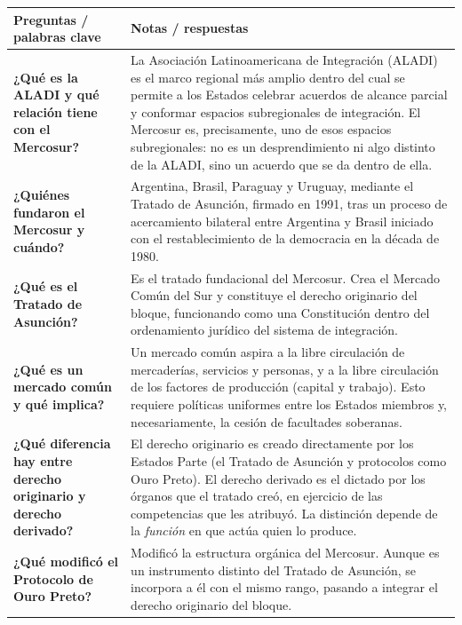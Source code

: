 \documentclass[12pt,oneside]{book}
\begin{document}
\begin{table}[H]
\centering
\begin{tabularx}{\textwidth}{
    >{\raggedright\arraybackslash}p{}
    >{\raggedright\arraybackslash}X
}
\toprule
\textbf{\large Preguntas / palabras clave} &
\textbf{\large Notas / respuestas} \\
\midrule

\textbf{¿Qué es la ALADI y qué relación tiene con el Mercosur?} &
La Asociación Latinoamericana de Integración (ALADI) es el marco regional más amplio dentro del cual se permite a los Estados celebrar acuerdos de alcance parcial y conformar espacios subregionales de integración. El Mercosur es, precisamente, uno de esos espacios subregionales: no es un desprendimiento ni algo distinto de la ALADI, sino un acuerdo que se da dentro de ella. \\

\textbf{¿Quiénes fundaron el Mercosur y cuándo?} &
Argentina, Brasil, Paraguay y Uruguay, mediante el Tratado de Asunción, firmado en 1991, tras un proceso de acercamiento bilateral entre Argentina y Brasil iniciado con el restablecimiento de la democracia en la década de 1980. \\

\textbf{¿Qué es el Tratado de Asunción?} &
Es el tratado fundacional del Mercosur. Crea el Mercado Común del Sur y constituye el derecho originario del bloque, funcionando como una Constitución dentro del ordenamiento jurídico del sistema de integración. \\

\textbf{¿Qué es un mercado común y qué implica?} &
Un mercado común aspira a la libre circulación de mercaderías, servicios y personas, y a la libre circulación de los factores de producción (capital y trabajo). Esto requiere políticas uniformes entre los Estados miembros y, necesariamente, la cesión de facultades soberanas. \\

\textbf{¿Qué diferencia hay entre derecho originario y derecho derivado?} &
El derecho originario es creado directamente por los Estados Parte (el Tratado de Asunción y protocolos como Ouro Preto). El derecho derivado es el dictado por los órganos que el tratado creó, en ejercicio de las competencias que les atribuyó. La distinción depende de la \textit{función} en que actúa quien lo produce. \\

\textbf{¿Qué modificó el Protocolo de Ouro Preto?} &
Modificó la estructura orgánica del Mercosur. Aunque es un instrumento distinto del Tratado de Asunción, se incorpora a él con el mismo rango, pasando a integrar el derecho originario del bloque. \\


\end{tabularx}
\end{table}
\end{document}
